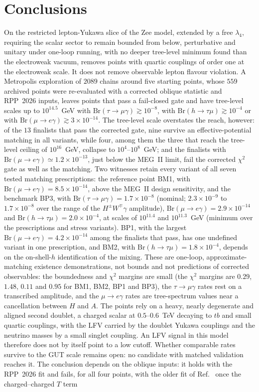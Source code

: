 \documentclass[twocolumn,epjc3]{svjour3}
\newcommand{\Br}{\mathrm{Br}}
\begin{document}
\section{Conclusions}
On the restricted lepton-Yukawa slice of the Zee model, extended by a free $\lambda_4$, requiring the scalar sector to remain bounded from below, perturbative and unitary under one-loop running, with no deeper tree-level minimum found than the electroweak vacuum, removes points with quartic couplings of order one at the electroweak scale. It does not remove observable lepton flavour violation. A Metropolis exploration of $2089$ chains around five starting points, whose $559$ archived points were re-evaluated with a corrected oblique statistic and RPP~2026 inputs, leaves points that pass a fail-closed gate and have tree-level scales up to $10^{14.5}$~GeV with $\Br(\tau\to\mu\gamma)\gtrsim10^{-8}$, with $\Br(h\to\tau\mu)\gtrsim10^{-4}$ or with $\Br(\mu\to e\gamma)\gtrsim3\times10^{-14}$. The tree-level scale overstates the reach, however: of the $13$ finalists that pass the corrected gate, nine survive an effective-potential matching in all variants, while four, among them the three that reach the tree-level ceiling of $10^{16}$~GeV, collapse to $10^{4}$--$10^{8}$~GeV; and the finalists with $\Br(\mu\to e\gamma)\simeq1.2\times10^{-13}$, just below the MEG~II limit, fail the corrected $\chi^2$ gate as well as the matching. Two witnesses retain every variant of all seven tested matching prescriptions: the reference point BM1, with $\Br(\mu\to e\gamma)=8.5\times10^{-14}$, above the MEG~II design sensitivity, and the benchmark BP3, with $\Br(\tau\to\mu\gamma)=1.7\times10^{-8}$ (nominal; $2.3\times10^{-9}$ to $1.7\times10^{-8}$ over the range of the $H^\pm W^\mp\gamma$ amplitude), $\Br(\mu\to e\gamma)=2.9\times10^{-14}$ and $\Br(h\to\tau\mu)=2.0\times10^{-4}$, at scales of $10^{11.4}$ and $10^{11.3}$~GeV (minimum over the prescriptions and stress variants). BP1, with the largest $\Br(\mu\to e\gamma)=4.2\times10^{-14}$ among the finalists that pass, has one undefined variant in one prescription, and BM2, with $\Br(h\to\tau\mu)=1.8\times10^{-4}$, depends on the on-shell-$h$ identification of the mixing. These are one-loop, approximate-matching existence demonstrations, not bounds and not predictions of corrected observables: the boundedness and $\chi^2$ margins are small (the $\chi^2$ margins are $0.29$, $1.48$, $0.11$ and $0.95$ for BM1, BM2, BP1 and BP3), the $\tau\to\mu\gamma$ rates rest on a transcribed amplitude, and the $\mu\to e\gamma$ rates are tree-spectrum values near a cancellation between $H$ and $A$. The points rely on a heavy, nearly degenerate and aligned second doublet, a charged scalar at $0.5$--$0.6$~TeV decaying to $tb$ and small quartic couplings, with the LFV carried by the doublet Yukawa couplings and the neutrino masses by a small singlet coupling. An LFV signal in this model therefore does not by itself point to a low cutoff. Whether comparable rates survive to the GUT scale remains open: no candidate with matched validation reaches it. The conclusion depends on the oblique inputs: it holds with the RPP~2026 fit and fails, for all four points, with the older fit of Ref.~\cite{HerreroGarcia:2017xdq} once the charged--charged $T$ term 
\end{document}
